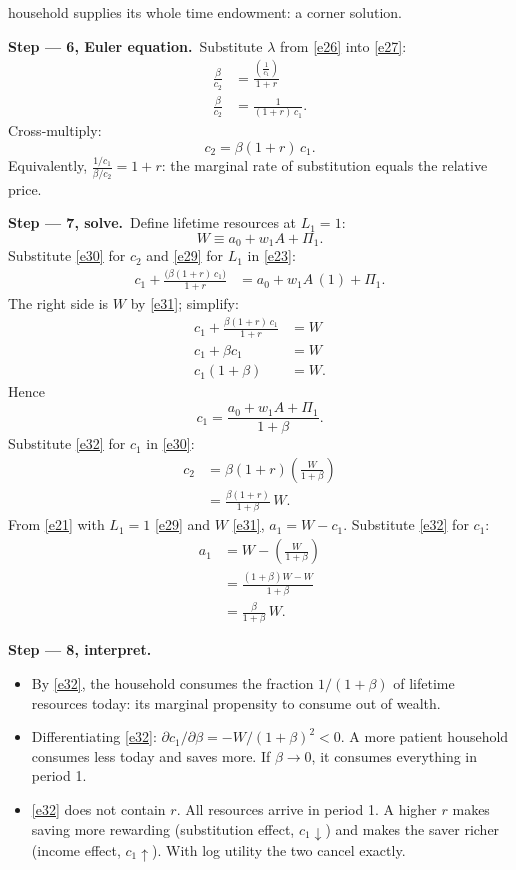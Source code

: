 \documentclass[11pt,a4paper]{article}
\newcommand{\passo}[1]{\par\smallskip\noindent\textbf{Step --- #1.}~}
\begin{document}
household supplies its whole time endowment: a corner solution.
\passo{6, Euler equation}Substitute $\lambda$ from \eqref{e26} into \eqref{e27}:
\begin{align*}
\frac{\beta}{c_2} &= \frac{\left(\frac{1}{c_1}\right)}{1+r}\\
\frac{\beta}{c_2} &= \frac{1}{(1+r)\,c_1}.
\end{align*}
Cross-multiply:
\begin{equation}
c_2=\beta(1+r)\,c_1. \label{e30}
\end{equation}
Equivalently, $\frac{1/c_1}{\beta/c_2}=1+r$: the marginal rate of substitution equals the relative
price.
\passo{7, solve}Define lifetime resources at $L_1=1$:
\begin{equation}
W\equiv a_0+w_1A+\Pi_1. \label{e31}
\end{equation}
Substitute \eqref{e30} for $c_2$ and \eqref{e29} for $L_1$ in \eqref{e23}:
\begin{align*}
c_1+\frac{\big(\beta(1+r)\,c_1\big)}{1+r} &= a_0+w_1A\,(1)+\Pi_1 .
\end{align*}
The right side is $W$ by \eqref{e31}; simplify:
\begin{align*}
c_1+\frac{\beta(1+r)\,c_1}{1+r} &= W\\
c_1+\beta c_1 &= W\\
c_1(1+\beta) &= W.
\end{align*}
Hence
\begin{equation}
\boxed{c_1=\frac{a_0+w_1A+\Pi_1}{1+\beta}}. \label{e32}
\end{equation}
Substitute \eqref{e32} for $c_1$ in \eqref{e30}:
\begin{align}
c_2 &= \beta(1+r)\left(\frac{W}{1+\beta}\right)\nonumber\\
&= \frac{\beta(1+r)}{1+\beta}\,W. \label{e33}
\end{align}
From \eqref{e21} with $L_1=1$ \eqref{e29} and $W$ \eqref{e31}, $a_1=W-c_1$. Substitute \eqref{e32} for
$c_1$:
\begin{align}
a_1 &= W-\left(\frac{W}{1+\beta}\right)\nonumber\\
&= \frac{(1+\beta)W-W}{1+\beta}\nonumber\\
&= \frac{\beta}{1+\beta}\,W. \label{e34}
\end{align}
\passo{8, interpret}
\begin{itemize}[leftmargin=1.4em]
\item By \eqref{e32}, the household consumes the fraction $1/(1+\beta)$ of lifetime resources
today: its marginal propensity to consume out of wealth.
\item Differentiating \eqref{e32}: $\partial c_1/\partial\beta=-W/(1+\beta)^2<0$. A more patient
household consumes less today and saves more. If $\beta\to0$, it consumes everything in period 1.
\item \eqref{e32} does not contain $r$. All resources arrive in period 1. A higher $r$ makes saving
more rewarding (substitution effect, $c_1\downarrow$) and makes the saver richer (income effect,
$c_1\uparrow$). With log utility the two cancel exactly.
\end{itemize}
\end{document}
